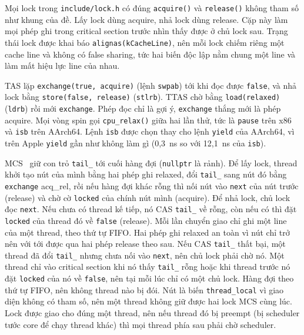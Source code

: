 Mọi lock trong \texttt{include/lock.h} có đúng \texttt{acquire()} và \texttt{release()} không tham số như
khung của đề. Lấy lock dùng acquire, nhả lock dùng release. Cặp này làm mọi phép ghi trong critical
section trước nhìn thấy được ở chủ lock sau. Trạng thái lock được khai báo \texttt{alignas(kCacheLine)},
nên mỗi lock chiếm riêng một cache line và không có false sharing, tức hai biến độc lập nằm chung một
line và làm mất hiệu lực line của nhau.

TAS lặp \texttt{exchange(true, acquire)} (lệnh \texttt{swpab}) tới khi đọc được \texttt{false}, và nhả
lock bằng \texttt{store(false, release)} (\texttt{stlrb}). TTAS chờ bằng \texttt{load(relaxed)}
(\texttt{ldrb}) rồi mới \texttt{exchange}. Phép đọc chỉ là gợi ý, \texttt{exchange} thắng mới là phép
acquire. Mọi vòng spin gọi \texttt{cpu\_relax()} giữa hai lần thử, tức là \texttt{pause} trên x86 và
\texttt{isb} trên AArch64. Lệnh \texttt{isb} được chọn thay cho lệnh \texttt{yield} của AArch64, vì trên
Apple \texttt{yield} gần như không làm gì (0,3~ns so với 12,1~ns của \texttt{isb}).

MCS~\cite{mellorcrummey1991mcs} giữ con trỏ \texttt{tail\_} tới cuối hàng đợi (\texttt{nullptr} là
rảnh). Để lấy lock, thread khởi tạo nút của mình bằng hai phép ghi relaxed, đổi \texttt{tail\_} sang nút
đó bằng \texttt{exchange} acq\_rel, rồi nếu hàng đợi khác rỗng thì nối nút vào \texttt{next} của nút
trước (release) và chờ cờ \texttt{locked} của chính nút mình (acquire). Để nhả lock, chủ lock đọc
\texttt{next}. Nếu chưa có thread kế tiếp, nó CAS \texttt{tail\_} về rỗng, còn nếu có thì đặt
\texttt{locked} của thread đó về \texttt{false} (release). Mỗi lần chuyển giao chỉ ghi một line của một
thread, theo thứ tự FIFO. Hai phép ghi relaxed an toàn vì nút chỉ trở nên với tới được qua hai phép
release theo sau. Nếu CAS
\texttt{tail\_} thất bại, một thread đã đổi \texttt{tail\_} nhưng chưa nối vào \texttt{next}, nên chủ
lock phải chờ nó. Một thread chỉ vào critical section khi nó thấy \texttt{tail\_} rỗng hoặc khi thread
trước nó đặt \texttt{locked} của nó về \texttt{false}, nên tại mỗi lúc chỉ có một chủ lock. Hàng đợi
theo thứ tự FIFO, nên không thread nào bị đói. Nút là biến \texttt{thread\_local} vì giao diện không có
tham số, nên một thread không giữ được hai lock MCS cùng lúc. Lock được giao cho đúng một thread, nên nếu
thread đó bị preempt (bị scheduler tước core để chạy thread khác) thì mọi thread phía sau phải chờ
scheduler.

